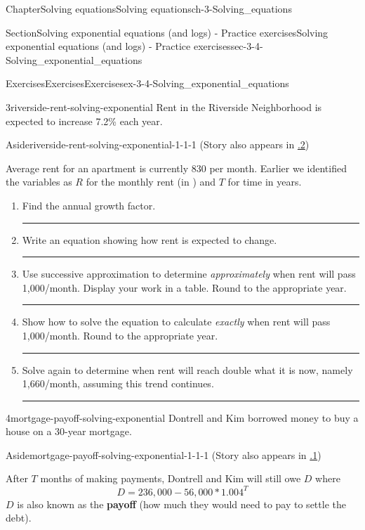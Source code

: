 \documentclass[twoside,11pt,]{book}
\newcommand{\xreffont}{\relax}
\newcommand{\terminology}[1]{\textbf{#1}}
\newlength{\workspacestrutwidth}
\numberwithin{equation}{section}
\begin{document}
\begin{chapterptx}{Chapter}{Solving equations}{}{Solving equations}{}{}{ch-3-Solving_equations}
\begin{sectionptx}{Section}{Solving exponential equations (and logs) - Practice exercises}{}{Solving exponential equations (and logs) - Practice exercises}{}{}{sec-3-4-Solving_exponential_equations}
\begin{exercises-subsection-numberless}{Exercises}{Exercises}{}{Exercises}{}{}{ex-3-4-Solving_exponential_equations}
\begin{divisionexercise}{3}{}{}{riverside-rent-solving-exponential}
Rent in the Riverside Neighborhood is expected to increase 7.2\% each year. \begin{aside}{Aside}{}{riverside-rent-solving-exponential-1-1-1}%
(Story also appears in \hyperlink{riverside-rent-variables-functions}{{\xreffont 1.1.2}})%
\end{aside}
 Average rent for an apartment is currently \textdollar{}830 per month. Earlier we identified the variables as \(R\) for the monthly rent (in \textdollar{}) and \(T\) for time in years.%
\begin{enumerate}[label=(\alph*),ref=\alph*]%
\item{}Find the annual growth factor.%
\par\rule{\workspacestrutwidth}{0.75in}%
\item{}Write an equation showing how rent is expected to change.%
\par\rule{\workspacestrutwidth}{0.75in}%
\item{}Use successive approximation to determine \emph{approximately} when rent will pass \textdollar{}1,000\slash{}month. Display your work in a table. Round to the appropriate year.%
\par\rule{\workspacestrutwidth}{1.2in}%
\item{}Show how to solve the equation to calculate \emph{exactly} when rent will pass \textdollar{}1,000\slash{}month. Round to the appropriate year.%
\par\rule{\workspacestrutwidth}{1.2in}%
\item{}Solve again to determine when rent will reach double what it is now, namely \textdollar{}1,660\slash{}month, assuming this trend continues.%
\par\rule{\workspacestrutwidth}{1.2in}%
\end{enumerate}%
\end{divisionexercise}%
\clearpage
\begin{divisionexercise}{4}{}{}{mortgage-payoff-solving-exponential}%
Dontrell and Kim borrowed money to buy a house on a 30-year mortgage. \begin{aside}{Aside}{}{mortgage-payoff-solving-exponential-1-1-1}%
(Story also appears in \hyperlink{mortgage-payoff-using-equations}{{\xreffont 2.3.1}})%
\end{aside}
 After \(T\) months of making payments, Dontrell and Kim will still owe \textdollar{}\(D\) where%
\begin{equation*}
D=236{,}000-56{,}000 \ast 1.004^T
\end{equation*}
\(D\) is also known as the \terminology{payoff} (how much they would need to pay to settle the debt).%

\end{divisionexercise}
\end{exercises-subsection-numberless}
\end{sectionptx}
\end{chapterptx}
\end{document}

